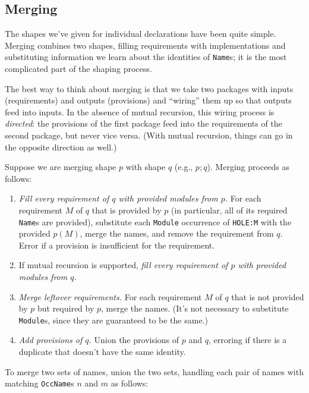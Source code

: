 \documentclass{article}
\begin{document}
\newpage

\subsection{Merging}

The shapes we've given for individual declarations have been quite
simple.  Merging combines two shapes, filling requirements with
implementations and substituting information we learn about the
identities of \verb|Name|s; it is the most complicated part of the
shaping process.

The best way to think about merging is that we take two packages with
inputs (requirements) and outputs (provisions) and ``wiring'' them up so
that outputs feed into inputs.  In the absence
of mutual recursion, this wiring process is \emph{directed}: the provisions
of the first package feed into the requirements of the second package,
but never vice versa.  (With mutual recursion, things can go in the opposite
direction as well.)

Suppose we are merging shape $p$ with shape $q$ (e.g., $p; q$).  Merging
proceeds as follows:

\begin{enumerate}
    \item \emph{Fill every requirement of $q$ with provided modules from
        $p$.} For each requirement $M$ of $q$ that is provided by $p$ (in particular,
        all of its required \verb|Name|s are provided),
        substitute each \verb|Module| occurrence of \verb|HOLE:M| with the
        provided $p(M)$, merge the names, and remove the requirement from $q$.
        Error if a provision is insufficient for the requirement.
    \item If mutual recursion is supported, \emph{fill every requirement of $p$ with provided modules from $q$.}
    \item \emph{Merge leftover requirements.}  For each requirement $M$ of $q$ that is not
        provided by $p$ but required by $p$, merge the names.  (It's not
        necessary to substitute \verb|Module|s, since they are guaranteed to be the same.)
    \item \emph{Add provisions of $q$.} Union the provisions of $p$ and $q$, erroring
        if there is a duplicate that doesn't have the same identity.
\end{enumerate}
%
To merge two sets of names, union the two sets, handling each pair of names with matching \verb|OccName|s $n$ and $m$ as follows:
\end{document}
